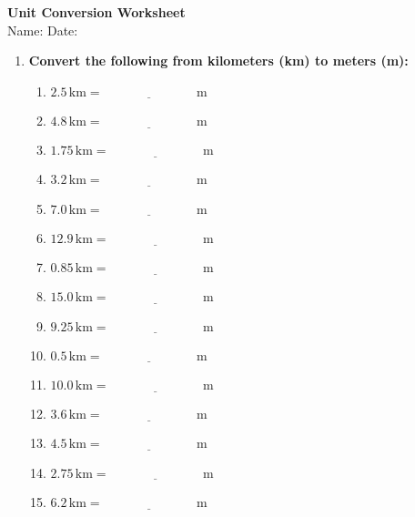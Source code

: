 \documentclass[12pt]{article}
\begin{document}
\begin{center}
    \Large \textbf{Unit Conversion Worksheet} \\
    \normalsize Name: \underline{\hspace{5cm}} \hfill Date: \underline{\hspace{3cm}}
\end{center}
\vspace{10pt}

\begin{enumerate}
    \item \textbf{Convert the following from kilometers (km) to meters (m):}
    \begin{multicols}{2}
    \begin{enumerate}
        \item \(2.5 \, \text{km} = \underline{\hspace{3cm}} \, \text{m}\)
        \item \(4.8 \, \text{km} = \underline{\hspace{3cm}} \, \text{m}\)
        \item \(1.75 \, \text{km} = \underline{\hspace{3cm}} \, \text{m}\)
        \item \(3.2 \, \text{km} = \underline{\hspace{3cm}} \, \text{m}\)
        \item \(7.0 \, \text{km} = \underline{\hspace{3cm}} \, \text{m}\)
        \item \(12.9 \, \text{km} = \underline{\hspace{3cm}} \, \text{m}\)
        \item \(0.85 \, \text{km} = \underline{\hspace{3cm}} \, \text{m}\)
        \item \(15.0 \, \text{km} = \underline{\hspace{3cm}} \, \text{m}\)
        \item \(9.25 \, \text{km} = \underline{\hspace{3cm}} \, \text{m}\)
        \item \(0.5 \, \text{km} = \underline{\hspace{3cm}} \, \text{m}\)
        \item \(10.0 \, \text{km} = \underline{\hspace{3cm}} \, \text{m}\)
        \item \(3.6 \, \text{km} = \underline{\hspace{3cm}} \, \text{m}\)
        \item \(4.5 \, \text{km} = \underline{\hspace{3cm}} \, \text{m}\)
        \item \(2.75 \, \text{km} = \underline{\hspace{3cm}} \, \text{m}\)
        \item \(6.2 \, \text{km} = \underline{\hspace{3cm}} \, \text{m}\)
    \end{enumerate}
    \end{multicols}


\end{enumerate}
\end{document}
